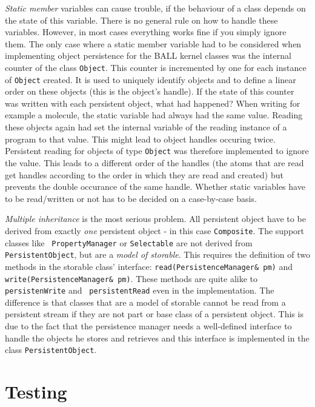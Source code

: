 \documentclass[a4paper,10pt]{article}
\begin{document}
{\em Static member} variables can cause trouble, if the behaviour of a class depends
on the state of this variable. There is no general rule on how to handle these
variables. However, in most cases everything works fine if you simply ignore
them. The only case where a static member variable had to be considered when
implementing object persistence for the BALL kernel classes was the internal
counter of the class {\tt Object}. This counter is incremented by one for each
instance of {\tt Object} created. It is used to uniquely identify objects and
to define a linear order on these objects (this is the object's handle).
If the state of this counter was written with each persistent object, what
had happened? When writing for example a molecule, the static variable had
always had the same value. Reading these objects again had set the internal
variable of the reading instance of a program to that value. This might lead
to object handles occuring twice. Persistent reading for objects of type {\tt Object} 
was therefore implemented to ignore the value. This leads to a different order
of the handles (the atoms that are read get handles according to the order in
which they are read and created) but prevents the double occurance of the same
handle. Whether static variables have to be read/written or not has to be
decided  on a case-by-case basis.

{\em Multiple inheritance} is the most serious problem. 
All persistent object have to be derived from exactly {\em one} persistent
object - in this case {\tt Composite}. The support classes like {\tt
PropertyManager} or {\tt Selectable} are not derived from {\tt
PersistentObject}, but are a {\em model of storable}. 
This requires the definition of two methods in the storable class' interface:
{\tt read(PersistenceManager\& pm)} and {\tt write(PersistenceManager\& pm)}.
These methods are quite alike to {\tt persistenWrite} and {\tt
persistentRead} even in the implementation. The difference is that classes
that are a model of storable cannot be read from a persistent stream if they
are not part or base class of a persistent object. This is due to the fact
that the persistence manager needs a well-defined interface to handle the
objects he stores and retrieves and this interface is implemented in the class
{\tt PersistentObject}. 

\section{Testing}
\end{document}
